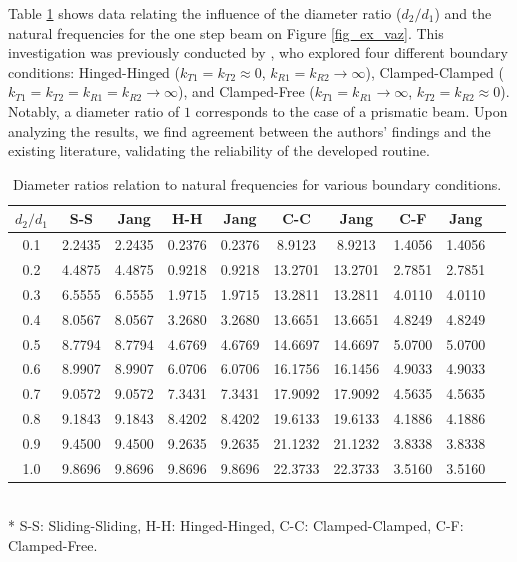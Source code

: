 Table \ref{tab_ex_jang} shows data relating the influence of the diameter ratio ($d_2/d_1$) and the natural frequencies for the one step beam on Figure \ref{fig_ex_vaz}. This investigation was previously conducted by \textcite{jang1989b}, who explored four different boundary conditions: Hinged-Hinged ($k_{T1} = k_{T2} \approx 0$, $k_{R1} = k_{R2} \rightarrow \infty$), Clamped-Clamped ($k_{T1} = k_{T2} = k_{R1} = k_{R2} \rightarrow \infty$), and Clamped-Free ($k_{T1} = k_{R1} \rightarrow \infty$, $k_{T2} = k_{R2} \approx 0$). Notably, a diameter ratio of $1$ corresponds to the case of a prismatic beam. Upon analyzing the results, we find agreement between the authors' findings and the existing literature, validating the reliability of the developed routine.
\begin{table}[h]
\caption{Diameter ratios relation to natural frequencies for various boundary conditions.}
\centering
\begin{tabular}{cccccccccc}
\toprule
$d_2/d_1$ & S-S & Jang & H-H & Jang & C-C & Jang & C-F & Jang \\
\midrule
0.1 & 2.2435 & 2.2435 & 0.2376 & 0.2376 & 8.9123  & 8.9213  & 1.4056 & 1.4056 \\
0.2 & 4.4875 & 4.4875 & 0.9218 & 0.9218 & 13.2701 & 13.2701 & 2.7851 & 2.7851 \\
0.3 & 6.5555 & 6.5555 & 1.9715 & 1.9715 & 13.2811 & 13.2811 & 4.0110 & 4.0110 \\
0.4 & 8.0567 & 8.0567 & 3.2680 & 3.2680 & 13.6651 & 13.6651 & 4.8249 & 4.8249 \\
0.5 & 8.7794 & 8.7794 & 4.6769 & 4.6769 & 14.6697 & 14.6697 & 5.0700 & 5.0700 \\
0.6 & 8.9907 & 8.9907 & 6.0706 & 6.0706 & 16.1756 & 16.1456 & 4.9033 & 4.9033 \\
0.7 & 9.0572 & 9.0572 & 7.3431 & 7.3431 & 17.9092 & 17.9092 & 4.5635 & 4.5635 \\
0.8 & 9.1843 & 9.1843 & 8.4202 & 8.4202 & 19.6133 & 19.6133 & 4.1886 & 4.1886 \\
0.9 & 9.4500 & 9.4500 & 9.2635 & 9.2635 & 21.1232 & 21.1232 & 3.8338 & 3.8338 \\
1.0 & 9.8696 & 9.8696 & 9.8696 & 9.8696 & 22.3733 & 22.3733 & 3.5160 & 3.5160 \\
\bottomrule
\end{tabular}
\\ \vspace{2pt} \footnotesize{* S-S: Sliding-Sliding, H-H: Hinged-Hinged, C-C: Clamped-Clamped, C-F: Clamped-Free.}
\label{tab_ex_jang} 
\end{table}

